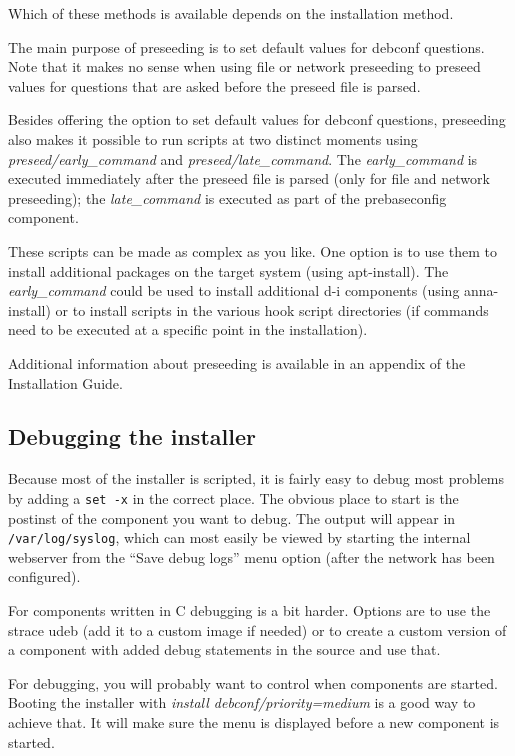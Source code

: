 \documentclass[a4paper,10pt]{article}
\begin{document}
Which of these methods is available depends on the installation method. 

The main purpose of preseeding is to set default values for debconf questions. Note that it makes no sense when using file or network preseeding to preseed values for questions that are asked before the preseed file is parsed. 

Besides offering the option to set default values for debconf questions, preseeding also makes it possible to run scripts at two distinct moments using \textit{preseed/early\_command} and \textit{preseed/late\_command}. The \textit{early\_command} is executed immediately after the preseed file is parsed (only for file and network preseeding); the \textit{late\_command} is executed as part of the prebaseconfig component. 

These scripts can be made as complex as you like. One option is to use them to install additional packages on the target system (using apt-install). The \textit{early\_command} could be used to install additional d-i components (using anna-install) or to install scripts in the various hook script directories (if commands need to be executed at a specific point in the installation). 

Additional information about preseeding is available in an appendix of the Installation Guide. 


\subsection{Debugging the installer}
Because most of the installer is scripted, it is fairly easy to debug most problems by adding a \texttt{set -x} in the correct place. The obvious place to start is the postinst of the component you want to debug. The output will appear in \texttt{/var/log/syslog}, which can most easily be viewed by starting the internal webserver from the “Save debug logs” menu option (after the network has been configured). 

For components written in C debugging is a bit harder. Options are to use the strace udeb (add it to a custom image if needed) or to create a custom version of a component with added debug statements in the source and use that. 

For debugging, you will probably want to control when components are started. Booting the installer with \textit{install debconf/priority=medium} is a good way to achieve that. It will make sure the menu is displayed before a new component is started. 
\end{document}
